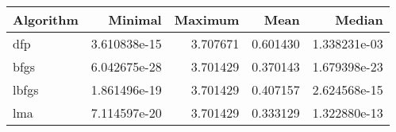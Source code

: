 \begin{tabular}{lrrrr}
\toprule
Algorithm &      Minimal &  Maximum &     Mean &       Median \\
\midrule
      dfp & 3.610838e-15 & 3.707671 & 0.601430 & 1.338231e-03 \\
     bfgs & 6.042675e-28 & 3.701429 & 0.370143 & 1.679398e-23 \\
    lbfgs & 1.861496e-19 & 3.701429 & 0.407157 & 2.624568e-15 \\
      lma & 7.114597e-20 & 3.701429 & 0.333129 & 1.322880e-13 \\
\bottomrule
\end{tabular}
